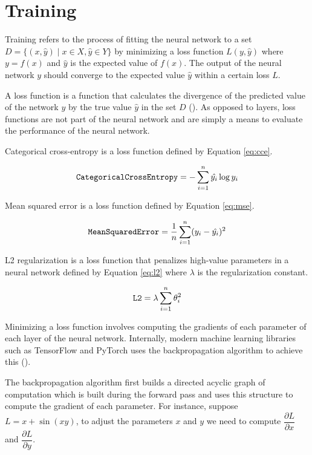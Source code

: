 \section{Training}

Training refers to the process of fitting the neural network to a set $D = \{ (x,\hat{y}) \mid x \in X, \hat{y} \in Y\}$ by minimizing a loss function $L(y, \hat{y})$ where $y = f(x)$ and $\hat{y}$ is the expected value of $f(x)$. The output of the neural network $y$ should converge to the expected value $\hat{y}$ within a certain loss $L$. 

A loss function is a function that calculates the divergence of the predicted value of the network $y$ by the true value $\hat{y}$ in the set $D$ (\cite{loss}). As opposed to layers, loss functions are not part of the neural network and are simply a means to evaluate the performance of the neural network.

Categorical cross-entropy is a loss function defined by Equation \ref{eq:cce}.

\begin{equation}
    \verb|CategoricalCrossEntropy| = -\sum_{i=1}^{n} \hat{y_i} \log y_i
    \label{eq:cce}
\end{equation}

Mean squared error is a loss function defined by Equation \ref{eq:mse}.

\begin{equation}
    \verb|MeanSquaredError| = \frac{1}{n}\sum_{i=1}^{n} (y_i - \hat{y_i})^{2}
    \label{eq:mse}
\end{equation}

L2 regularization is a loss function that penalizes high-value parameters in a neural network defined by Equation \ref{eq:l2} where $\lambda$ is the regularization constant.

\begin{equation}
    \verb|L2| = \lambda \sum_{i=1}^n\theta_i^2
    \label{eq:l2}
\end{equation}

Minimizing a loss function involves computing the gradients of each parameter of each layer of the neural network. Internally, modern machine learning libraries such as TensorFlow and PyTorch uses the backpropagation algorithm to achieve this (\cite{pytorch}).

The backpropagation algorithm first builds a directed acyclic graph of computation which is built during the forward pass and uses this structure to compute the gradient of each parameter. For instance, suppose $L = x + \sin(xy)$, to adjust the parameters $x$ and $y$ we need to compute $\dfrac{\partial L}{\partial x}$ and $\dfrac{\partial L}{\partial y}$.

